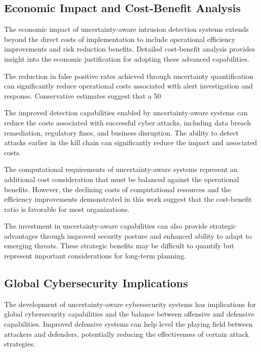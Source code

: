\documentclass[journal]{IEEEtran}
\begin{document}
\subsection{Economic Impact and Cost-Benefit Analysis}

The economic impact of uncertainty-aware intrusion detection systems extends beyond the direct costs of implementation to include operational efficiency improvements and risk reduction benefits. Detailed cost-benefit analysis provides insight into the economic justification for adopting these advanced capabilities.

The reduction in false positive rates achieved through uncertainty quantification can significantly reduce operational costs associated with alert investigation and response. Conservative estimates suggest that a 50%

The improved detection capabilities enabled by uncertainty-aware systems can reduce the costs associated with successful cyber attacks, including data breach remediation, regulatory fines, and business disruption. The ability to detect attacks earlier in the kill chain can significantly reduce the impact and associated costs.

The computational requirements of uncertainty-aware systems represent an additional cost consideration that must be balanced against the operational benefits. However, the declining costs of computational resources and the efficiency improvements demonstrated in this work suggest that the cost-benefit ratio is favorable for most organizations.

The investment in uncertainty-aware capabilities can also provide strategic advantages through improved security posture and enhanced ability to adapt to emerging threats. These strategic benefits may be difficult to quantify but represent important considerations for long-term planning.

\subsection{Global Cybersecurity Implications}

The development of uncertainty-aware cybersecurity systems has implications for global cybersecurity capabilities and the balance between offensive and defensive capabilities. Improved defensive systems can help level the playing field between attackers and defenders, potentially reducing the effectiveness of certain attack strategies.
\end{document}
